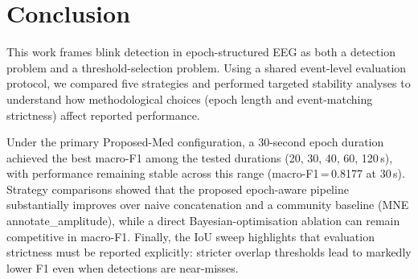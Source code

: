 

\section{Conclusion}

This work frames blink detection in epoch-structured EEG as both a detection problem and a
threshold-selection problem. Using a shared event-level evaluation protocol, we compared
five strategies and performed targeted stability analyses to understand how methodological
choices (epoch length and event-matching strictness) affect reported performance.

Under the primary Proposed-Med configuration, a 30-second epoch duration achieved the best
macro-F1 among the tested durations (20, 30, 40, 60, 120\,s), with performance remaining
stable across this range (macro-F1\,=\,0.8177 at 30\,s). Strategy comparisons showed
that the proposed epoch-aware pipeline substantially improves over naive concatenation and
a community baseline (MNE annotate\_amplitude), while a direct Bayesian-optimisation
ablation can remain competitive in macro-F1. Finally, the IoU sweep highlights that
evaluation strictness must be reported explicitly: stricter overlap thresholds lead to
markedly lower F1 even when detections are near-misses.
